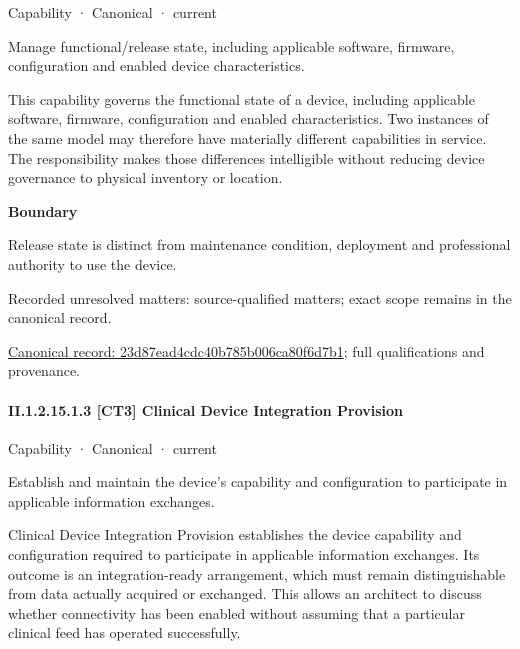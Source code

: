 \label{element:23d87ead4cdc40b785b006ca80f6d7b1}
{\small Capability · Canonical · current}\par

Manage functional/release state, including applicable software, firmware, configuration and enabled device characteristics.



This capability governs the functional state of a device, including applicable software, firmware, configuration and enabled characteristics. Two instances of the same model may therefore have materially different capabilities in service. The responsibility makes those differences intelligible without reducing device governance to physical inventory or location.



\textbf{Boundary}



Release state is distinct from maintenance condition, deployment and professional authority to use the device.


{\small Recorded unresolved matters: source-qualified matters; exact scope remains in the canonical record.}\par
{\footnotesize \href{../../../../continuum/strategy/capability/23d87ead4cdc40b785b006ca80f6d7b1.md}{Canonical record: 23d87ead4cdc40b785b006ca80f6d7b1}; full qualifications and provenance.}\par
\paragraph*{II.1.2.15.1.3 [CT3] Clinical Device Integration Provision}
\label{navigation:II.1.2.15.1.3}

\label{element:7abab1d7d68f48cea565df752fad34c4}
{\small Capability · Canonical · current}\par

Establish and maintain the device’s capability and configuration to participate in applicable information exchanges.



Clinical Device Integration Provision establishes the device capability and configuration required to participate in applicable information exchanges. Its outcome is an integration-ready arrangement, which must remain distinguishable from data actually acquired or exchanged. This allows an architect to discuss whether connectivity has been enabled without assuming that a particular clinical feed has operated successfully.



